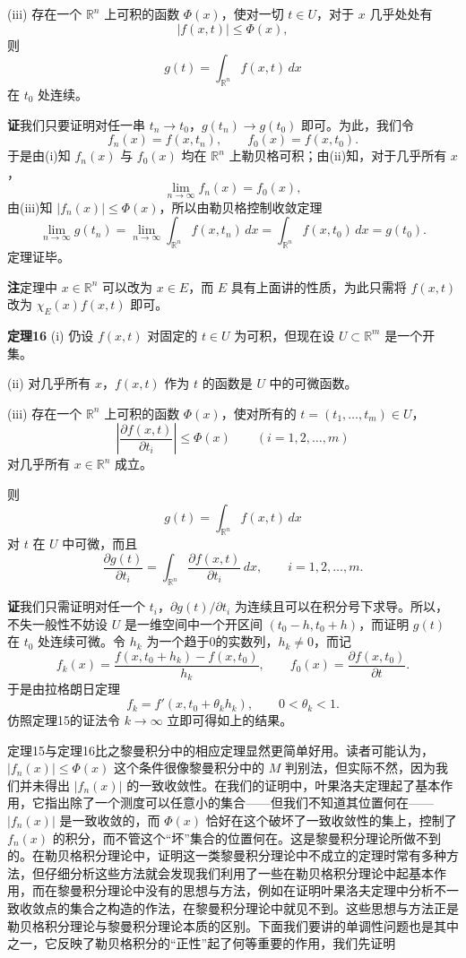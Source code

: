 (iii) 存在一个 $\mathbb R^n$ 上可积的函数 $\Phi(x)$，使对一切 $t\in U$，对于 $x$ 几乎处处有
\[
 |f(x,t)|\le\Phi(x),
\]
则
\[
 g(t)=\int_{\mathbb R^n}f(x,t)\,dx
\]
在 $t_0$ 处连续。

\noindent\textbf{证}\quad 我们只要证明对任一串 $t_n\to t_0$，$g(t_n)\to g(t_0)$ 即可。为此，我们令
\[
 f_n(x)=f(x,t_n),\qquad f_0(x)=f(x,t_0).
\]
于是由(i)知 $f_n(x)$ 与 $f_0(x)$ 均在 $\mathbb R^n$ 上勒贝格可积；由(ii)知，对于几乎所有 $x$，
\[
 \lim_{n\to\infty}f_n(x)=f_0(x),
\]
由(iii)知 $|f_n(x)|\le\Phi(x)$，所以由勒贝格控制收敛定理
\[
 \lim_{n\to\infty}g(t_n)=\lim_{n\to\infty}\int_{\mathbb R^n}f(x,t_n)\,dx
 =\int_{\mathbb R^n}f(x,t_0)\,dx=g(t_0).
\]
定理证毕。

\noindent\textbf{注}\quad 定理中 $x\in\mathbb R^n$ 可以改为 $x\in E$，而 $E$ 具有上面讲的性质，为此只需将 $f(x,t)$ 改为 $\chi_E(x)f(x,t)$ 即可。

\noindent\textbf{定理16}\quad
(i) 仍设 $f(x,t)$ 对固定的 $t\in U$ 为可积，但现在设 $U\subset\mathbb R^m$ 是一个开集。

(ii) 对几乎所有 $x$，$f(x,t)$ 作为 $t$ 的函数是 $U$ 中的可微函数。

(iii) 存在一个 $\mathbb R^n$ 上可积的函数 $\Phi(x)$，使对所有的 $t=(t_1,\ldots,t_m)\in U$，
\[
 \left|\frac{\partial f(x,t)}{\partial t_i}\right|\le\Phi(x)
 \qquad (i=1,2,\ldots,m)
\]
对几乎所有 $x\in\mathbb R^n$ 成立。

则
\[
 g(t)=\int_{\mathbb R^n}f(x,t)\,dx
\]
对 $t$ 在 $U$ 中可微，而且
\[
 \frac{\partial g(t)}{\partial t_i}
 =\int_{\mathbb R^n}\frac{\partial f(x,t)}{\partial t_i}\,dx,
 \qquad i=1,2,\ldots,m.
\]

\noindent\textbf{证}\quad 我们只需证明对任一个 $t_i$，$\partial g(t)/\partial t_i$ 为连续且可以在积分号下求导。所以，不失一般性不妨设 $U$ 是一维空间中一个开区间 $(t_0-h,t_0+h)$，而证明 $g(t)$ 在 $t_0$ 处连续可微。令 $h_k$ 为一个趋于0的实数列，$h_k\ne0$，而记
\[
 f_k(x)=\frac{f(x,t_0+h_k)-f(x,t_0)}{h_k},
 \qquad
 f_0(x)=\frac{\partial f(x,t_0)}{\partial t}.
\]
于是由拉格朗日定理
\[
 f_k=f'(x,t_0+\theta_kh_k),\qquad 0<\theta_k<1.
\]
仿照定理15的证法令 $k\to\infty$ 立即可得如上的结果。

定理15与定理16比之黎曼积分中的相应定理显然更简单好用。读者可能认为，$|f_n(x)|\le\Phi(x)$ 这个条件很像黎曼积分中的 $M$ 判别法，但实际不然，因为我们并未得出 $|f_n(x)|$ 的一致收敛性。在我们的证明中，叶果洛夫定理起了基本作用，它指出除了一个测度可以任意小的集合——但我们不知道其位置何在——$|f_n(x)|$ 是一致收敛的，而 $\Phi(x)$ 恰好在这个破坏了一致收敛性的集上，控制了 $f_n(x)$ 的积分，而不管这个“坏”集合的位置何在。这是黎曼积分理论所做不到的。在勒贝格积分理论中，证明这一类黎曼积分理论中不成立的定理时常有多种方法，但仔细分析这些方法就会发现我们利用了一些在勒贝格积分理论中起基本作用，而在黎曼积分理论中没有的思想与方法，例如在证明叶果洛夫定理中分析不一致收敛点的集合之构造的作法，在黎曼积分理论中就见不到。这些思想与方法正是勒贝格积分理论与黎曼积分理论本质的区别。下面我们要讲的单调性问题也是其中之一，它反映了勒贝格积分的“正性”起了何等重要的作用，我们先证明

